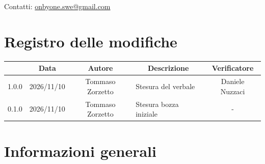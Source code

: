 \documentclass[11pt, a4paper]{article}
\begin{document}
\begin{titlepage}
    \vspace{0.5cm}
    
    {\large Contatti: \href{mailto:onbyone.swe@gmail.com}{onbyone.swe@gmail.com} }
    
\end{titlepage}

\newpage

\section*{Registro delle modifiche}

\vspace{1cm}
\begin{center}
    \renewcommand{\arraystretch}{1.5}
    \begin{tabularx}{\textwidth}{|c|c|c|X|c|}
        \hline
        \rowcolor{gray!10} 
        \multicolumn{1}{|c|}{\textbf{Versione}} & 
        \multicolumn{1}{c|}{\textbf{Data}} & 
        \multicolumn{1}{c|}{\textbf{Autore}} & 
        \multicolumn{1}{c|}{\textbf{Descrizione}} & 
        \multicolumn{1}{c|}{\textbf{Verificatore}} \\
        \hline
        1.0.0 & 2026/11/10 & Tommaso Zorzetto & Stesura del verbale & Daniele Nuzzaci \\
        \hline
        0.1.0 & 2026/11/10 & Tommaso Zorzetto & Stesura bozza iniziale & - \\
        \hline
    \end{tabularx}
\end{center}
\vfill
\newpage

\tableofcontents
\newpage

\section{Informazioni generali}
\end{document}

